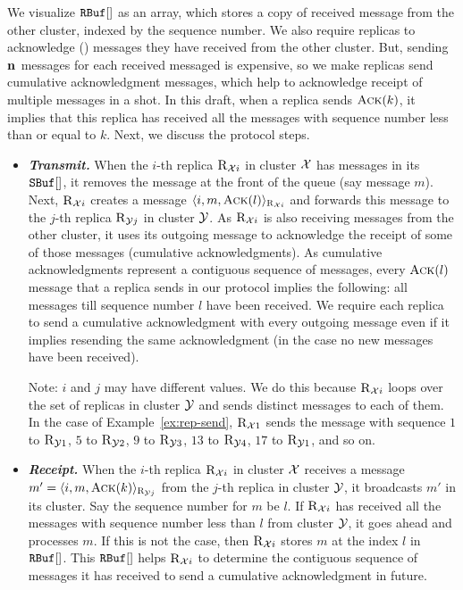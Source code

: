 We visualize $\texttt{RBuf}[{}]$ as an array, which stores a copy of received message from the other cluster, 
indexed by the sequence number.
We also require replicas to acknowledge () messages they have received from the other cluster. 
But, sending $\textbf{n}_{}$  messages for each received messaged is expensive, so we make replicas send 
cumulative acknowledgment messages, which help to acknowledge receipt of multiple messages in a shot. 
In this draft, when a replica sends $\textsc{Ack}(k)$, it implies that this replica has received all the messages 
with sequence number less than or equal to $k$.
Next, we discuss the protocol steps.

\begin{itemize}[wide]
\item {\bf \em Transmit.}
When the $i$-th replica $\textsc{R}_{{\mathcal{X}}{i}}$ in cluster $\mathcal{X}$ has messages in its $\texttt{SBuf}[{}]$, it 
removes the message at the front of the queue (say message $m$).
Next, $\textsc{R}_{{\mathcal{X}}{i}}$ creates a message $\langle{i},{m},\textsc{Ack}(l)\rangle_{\textsc{R}_{{\mathcal{X}}{i}}}$ 
and forwards this message to the $j$-th replica $\textsc{R}_{{\mathcal{Y}}{j}}$ in cluster $\mathcal{Y}$.
As $\textsc{R}_{{\mathcal{X}}{i}}$ is also receiving messages from the other cluster, it uses its outgoing message 
to acknowledge the receipt of some of those messages (cumulative acknowledgments). 
As cumulative acknowledgments represent a contiguous sequence of messages, every $\textsc{Ack}(l)$ message 
that a replica sends in our protocol implies the following: 
all messages till sequence number $l$ have been received.
We require each replica to send a cumulative acknowledgment with every outgoing message 
even if it implies resending the same acknowledgment (in the case no new messages have been received).


Note: $i$ and $j$ may have different values.
We do this because $\textsc{R}_{{\mathcal{X}}{i}}$ loops over the set of replicas in cluster $\mathcal{Y}$ and sends 
distinct messages to each of them.
In the case of Example~\ref{ex:rep-send}, 
$\textsc{R}_{{\mathcal{X}}{1}}$ sends the message with sequence $1$ to $\textsc{R}_{{\mathcal{Y}}{1}}$, $5$ to $\textsc{R}_{{\mathcal{Y}}{2}}$, 
$9$ to $\textsc{R}_{{\mathcal{Y}}{3}}$, $13$ to $\textsc{R}_{{\mathcal{Y}}{4}}$, $17$ to $\textsc{R}_{{\mathcal{Y}}{1}}$, and so on. 


\item {\bf \em Receipt.}
When the $i$-th replica $\textsc{R}_{{\mathcal{X}}{i}}$ in cluster $\mathcal{X}$ receives a message 
$m' = \langle{i},{m},\textsc{Ack}(k)\rangle_{\textsc{R}_{{\mathcal{Y}}{j}}}$ from the $j$-th replica in cluster $\mathcal{Y}$, 
it broadcasts $m'$ in its cluster.
Say the sequence number for $m$ be $l$.
If $\textsc{R}_{{\mathcal{X}}{i}}$ has received all the messages with sequence number less than $l$ from cluster $\mathcal{Y}$, 
it goes ahead and processes $m$. 
If this is not the case, then $\textsc{R}_{{\mathcal{X}}{i}}$ stores $m$ at the index $l$ in $\texttt{RBuf}[{}]$.
This $\texttt{RBuf}[{}]$ helps $\textsc{R}_{{\mathcal{X}}{i}}$ to determine the contiguous sequence of messages it has received to send a cumulative 
acknowledgment in future.


\end{itemize}
